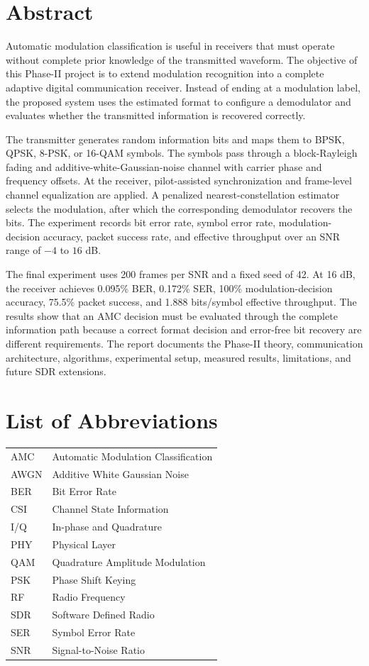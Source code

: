 \documentclass[12pt,twoside,openright]{report}
\begin{document}
\clearemptydoublepage
\chapter*{Abstract}
Automatic modulation classification is useful in receivers that must operate
without complete prior knowledge of the transmitted waveform. The objective
of this Phase-II project is to extend modulation recognition into a complete
adaptive digital communication receiver. Instead of ending at a modulation
label, the proposed system uses the estimated format to configure a
demodulator and evaluates whether the transmitted information is recovered
correctly.

The transmitter generates random information bits and maps them to BPSK,
QPSK, 8-PSK, or 16-QAM symbols. The symbols pass through a block-Rayleigh
fading and additive-white-Gaussian-noise channel with carrier phase and
frequency offsets. At the receiver, pilot-assisted synchronization and
frame-level channel equalization are applied. A penalized
nearest-constellation estimator selects the modulation, after which the
corresponding demodulator recovers the bits. The experiment records bit error
rate, symbol error rate, modulation-decision accuracy, packet success rate,
and effective throughput over an SNR range of $-4$ to $16$ dB.

The final experiment uses 200 frames per SNR and a fixed seed of 42. At
16 dB, the receiver achieves 0.095\% BER, 0.172\% SER, 100\%
modulation-decision accuracy, 75.5\% packet success, and 1.888
bits/symbol effective throughput. The results show that an AMC decision must
be evaluated through the complete information path because a correct format
decision and error-free bit recovery are different requirements. The report
documents the Phase-II theory, communication architecture, algorithms,
experimental setup, measured results, limitations, and future SDR extensions.

\clearemptydoublepage
\chapter*{List of Abbreviations}
\begin{tabular}{ll}
AMC & Automatic Modulation Classification \\
AWGN & Additive White Gaussian Noise \\
BER & Bit Error Rate \\
CSI & Channel State Information \\
I/Q & In-phase and Quadrature \\
PHY & Physical Layer \\
QAM & Quadrature Amplitude Modulation \\
PSK & Phase Shift Keying \\
RF & Radio Frequency \\
SDR & Software Defined Radio \\
SER & Symbol Error Rate \\
SNR & Signal-to-Noise Ratio \\
\end{tabular}
\end{document}
